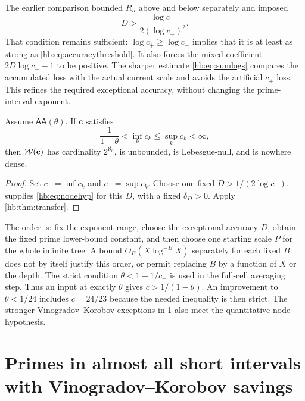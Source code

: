 \begin{remark}
\label{hb:rem:oldthreshold}
The earlier comparison bounded $R_n$ above and below separately
and imposed
\[
 D>\frac{\log c_+}{2(\log c_-)^2}.
\]
That condition remains sufficient: $\log c_+\ge\log c_-$ implies
that it is at least as strong as \eqref{hb:eq:accuracythreshold}.
It also forces the mixed coefficient $2D\log c_--1$ to be positive.
The sharper estimate \eqref{hb:eq:sumlogs} compares the accumulated
loss with the actual current scale and avoids the artificial
$c_+$ loss.  This refines the required exceptional accuracy, without
changing the prime-interval exponent.
\end{remark}

\begin{corollary}
\label{hb:cor:AAtransfer}
Assume $\mathsf{AA}(\theta)$.
If $\mathbf c$ satisfies
\[
 \frac1{1-\theta}<\inf_k c_k\le\sup_k c_k<\infty,
\]
then $\mathcal W(\mathbf c)$ has cardinality $2^{\aleph_0}$, is unbounded,
is Lebesgue-null, and is nowhere dense.
\end{corollary}

\begin{proof}
Set $c_-=\inf c_k$ and $c_+=\sup c_k$.
Choose one fixed $D>1/(2\log c_-)$.
 supplies \eqref{hb:eq:nodehyp} for this $D$,
with a fixed $\delta_D>0$.  Apply \cref{hb:thm:transfer}.
\end{proof}

\begin{remark}\label{hb:rem:quantifiers}
The order is: fix the exponent range, choose the exceptional
accuracy $D$, obtain the fixed prime lower-bound constant, and
then choose one starting scale $P$ for the whole infinite tree.
A bound $O_B(X\log^{-B}X)$ separately for each fixed $B$ does not
by itself justify this order, or permit replacing $B$ by a function
of $X$ or the depth.
The strict condition
$\theta<1-1/c_-$ is used in the full-cell averaging step.
Thus an input at exactly $\theta$ gives $c>1/(1-\theta)$.
An improvement to $\theta<1/24$ includes $c=24/23$ because
the needed inequality is then strict.
The stronger Vinogradov--Korobov exceptions in
\cref{sec:density} also meet the quantitative node hypothesis.
\end{remark}

\section{Primes in almost all short intervals with Vinogradov--Korobov savings}\label{sec:density}

